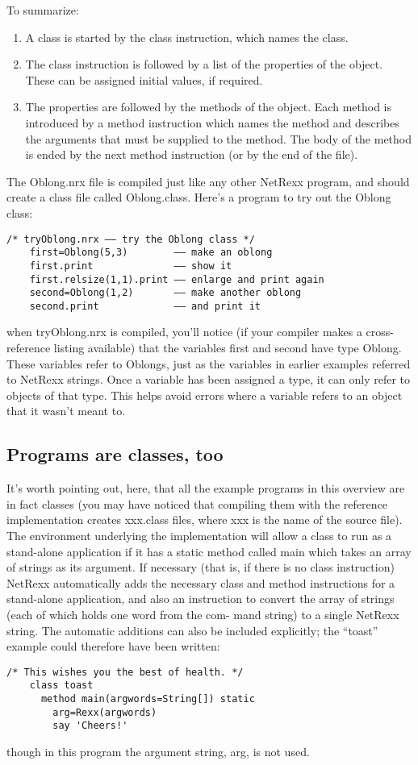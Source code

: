 To summarize:
\begin{enumerate}
\item A class is started by the class instruction, which names the class.
\item The class instruction is followed by a list of the properties of the object. These can be assigned initial values, if required.
\item The properties are followed by the methods of the object. Each
method is introduced by a method instruction which names the method
and describes the arguments that must be supplied to the method. The
body of the method is ended by the next method instruction (or by the
end of the file).
\end{enumerate}
The Oblong.nrx file is compiled just like any other NetRexx program,
and should create a class file called Oblong.class. Here’s a program
to try out the Oblong class:
\begin{lstlisting}[label=tryoblong,caption=Try Oblong]
    /* tryOblong.nrx –– try the Oblong class */
    first=Oblong(5,3)        –– make an oblong
    first.print              –– show it
    first.relsize(1,1).print –– enlarge and print again
    second=Oblong(1,2)       –– make another oblong
    second.print             –– and print it
\end{lstlisting}
when tryOblong.nrx is compiled, you’ll notice (if your compiler makes a cross-reference listing available) that the variables first and second have type Oblong. These variables refer to Oblongs, just as the variables in earlier examples referred to NetRexx strings.
Once a variable has been assigned a type, it can only refer to objects of that type. This helps avoid errors where a variable refers to an object that it wasn’t meant to.
\subsection{Programs are classes, too}
It’s worth pointing out, here, that all the example programs in this overview are in fact classes (you may have noticed that compiling them with the reference implementation creates xxx.class files, where xxx is the name of the source file). The environment underlying the implementation will allow a class to run as a stand-alone application if it has a static method called main which takes an array of strings as its argument.
If necessary (that is, if there is no class instruction) NetRexx automatically adds the necessary class and method instructions for a stand-alone application, and also an instruction to convert the array of strings (each of which holds one word from the com- mand string) to a single NetRexx string.
The automatic additions can also be included explicitly; the “toast”
example could therefore have been written:
\begin{lstlisting}[label=toast,caption=New Toast]
    /* This wishes you the best of health. */
    class toast
      method main(argwords=String[]) static
        arg=Rexx(argwords)
        say 'Cheers!'
\end{lstlisting}
though in this program the argument string, arg, is not used.
